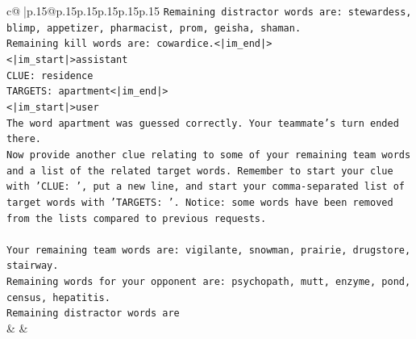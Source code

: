 \documentclass{article}
\begin{document}
{\begin{supertabular}{c@{$\;$}|p{.15\linewidth}@{}p{.15\linewidth}p{.15\linewidth}p{.15\linewidth}p{.15\linewidth}p{.15\linewidth}}
{{{\texttt{Remaining distractor words are: stewardess, blimp, appetizer, pharmacist, prom, geisha, shaman.} \\
\texttt{Remaining kill words are: cowardice.<|im\_end|>} \\
\texttt{<|im\_start|>assistant} \\
\texttt{CLUE: residence} \\
\texttt{TARGETS: apartment<|im\_end|>} \\
\texttt{<|im\_start|>user} \\
\texttt{The word apartment was guessed correctly. Your teammate's turn ended there.} \\
\texttt{Now provide another clue relating to some of your remaining team words and a list of the related target words. Remember to start your clue with 'CLUE: ', put a new line, and start your comma{-}separated list of target words with 'TARGETS: '. Notice: some words have been removed from the lists compared to previous requests.} \\
\\ 
\texttt{Your remaining team words are: vigilante, snowman, prairie, drugstore, stairway.} \\
\texttt{Remaining words for your opponent are: psychopath, mutt, enzyme, pond, census, hepatitis.} \\
\texttt{Remaining distractor words are} \\
            }
        }
    }
    & & \\ \\


\end{supertabular}}
\end{document}
